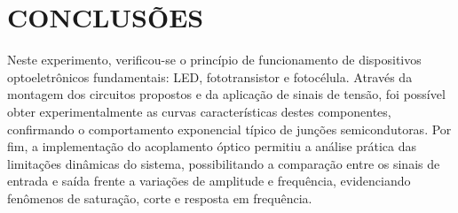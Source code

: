\section{CONCLUSÕES}

\noindent\hspace{.3cm}Neste experimento, verificou-se o princípio de funcionamento de dispositivos optoeletrônicos fundamentais: LED, fototransistor e fotocélula. Através da montagem dos circuitos propostos e da aplicação de sinais de tensão, foi possível obter experimentalmente as curvas características destes componentes, confirmando o comportamento exponencial típico de junções semicondutoras. Por fim, a implementação do acoplamento óptico permitiu a análise prática das limitações dinâmicas do sistema, possibilitando a comparação entre os sinais de entrada e saída frente a variações de amplitude e frequência, evidenciando fenômenos de saturação, corte e resposta em frequência.
